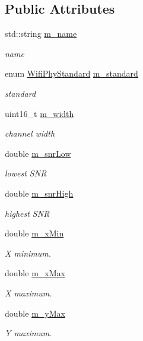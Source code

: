 \subsection*{Public Attributes}
\begin{DoxyCompactItemize}
\item 
std\+::string \hyperlink{structStandardInfo_a101f61fce329acf44c178f191d89bc2b}{m\+\_\+name}
\begin{DoxyCompactList}\small\item\em name \end{DoxyCompactList}\item 
enum \hyperlink{group__wifi_ga1299834f4e1c615af3ca738033b76a49}{Wifi\+Phy\+Standard} \hyperlink{structStandardInfo_ab7a9f14bfafa7c4a6eb65073bdb28489}{m\+\_\+standard}
\begin{DoxyCompactList}\small\item\em standard \end{DoxyCompactList}\item 
uint16\+\_\+t \hyperlink{structStandardInfo_a5b3709fd42061dfc2a51115978136abc}{m\+\_\+width}
\begin{DoxyCompactList}\small\item\em channel width \end{DoxyCompactList}\item 
double \hyperlink{structStandardInfo_afab2372a0827fa35dfb275bf2a003894}{m\+\_\+snr\+Low}
\begin{DoxyCompactList}\small\item\em lowest S\+NR \end{DoxyCompactList}\item 
double \hyperlink{structStandardInfo_a9015b8320c397f26eb0eb0d3758c9efa}{m\+\_\+snr\+High}
\begin{DoxyCompactList}\small\item\em highest S\+NR \end{DoxyCompactList}\item 
double \hyperlink{structStandardInfo_af07b86a8ed5fc63871218325776c77e1}{m\+\_\+x\+Min}
\begin{DoxyCompactList}\small\item\em X minimum. \end{DoxyCompactList}\item 
double \hyperlink{structStandardInfo_a9273620f117082177fb82865c3372e41}{m\+\_\+x\+Max}
\begin{DoxyCompactList}\small\item\em X maximum. \end{DoxyCompactList}\item 
double \hyperlink{structStandardInfo_a7037180b40be174fdb983b9c92084a1f}{m\+\_\+y\+Max}
\begin{DoxyCompactList}\small\item\em Y maximum. \end{DoxyCompactList}\end{DoxyCompactItemize}


